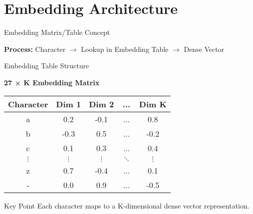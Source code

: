 \documentclass[usenames,dvipsnames]{beamer}
\begin{document}
\section{Embedding Architecture}

\begin{frame}{Embedding Matrix/Table Concept}
\begin{center}
\end{center}

\vspace{1cm}
\begin{center}
\textbf{Process:} Character $\rightarrow$ Lookup in Embedding Table $\rightarrow$ Dense Vector
\end{center}
\end{frame}

\begin{frame}{Embedding Table Structure}
\begin{center}
\textbf{27 × K Embedding Matrix}
\vspace{0.5cm}

\begin{tabular}{|c|c|c|c|c|}
\hline
\textbf{Character} & \textbf{Dim 1} & \textbf{Dim 2} & \textbf{...} & \textbf{Dim K} \\
\hline
a & 0.2 & -0.1 & ... & 0.8 \\
b & -0.3 & 0.5 & ... & -0.2 \\
c & 0.1 & 0.3 & ... & 0.4 \\
$\vdots$ & $\vdots$ & $\vdots$ & $\ddots$ & $\vdots$ \\
z & 0.7 & -0.4 & ... & 0.1 \\
- & 0.0 & 0.9 & ... & -0.5 \\
\hline
\end{tabular}
\end{center}

\vspace{0.5cm}
\begin{alertblock}{Key Point}
Each character maps to a K-dimensional dense vector representation.
\end{alertblock}
\end{frame}
\end{document}
